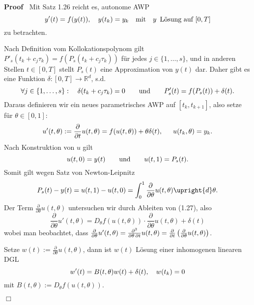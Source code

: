 \documentclass{book}
\newcommand{\assign}{:=}
\newenvironment{proof}{\noindent\textbf{Proof\ }}{\hspace*{\fill}$\Box$\medskip}
\begin{document}
\begin{proof}
  Mit Satz 1.26 reicht es, autonome AWP
  \[ y' (t) = f (y (t)), \text{\quad} y (t_k) = y_k \quad \text{mit\quad} y
     \enspace \text{L{\"o}sung auf } [0, T] \]
  zu betrachten.
  
  Nach Definition vom Kollokationspolynom gilt $P'_s (t_k + c_j \tau_k) = f
  (P_s (t_k + c_j \tau_k))$ f{\"u}r jedes $j \in \{ 1, \ldots, s \}$, und in
  anderen Stellen $t \in [0, T]$ stellt $P_s (t)$ eine Approximation von $y
  (t)$ dar. Daher gibt es eine Funktion $\delta : [0, T] \rightarrow
  \mathbb{R}^d$, s.d.
  \[ \forall j \in \{ 1, \ldots, s \} : \text{\quad} \delta (t_k + c_j
     \tau_k) = 0 \text{\qquad und\qquad} P'_s (t) = f (P_s (t)) + \delta (t) .
  \]
  {\hspace{1.7em}}Daraus definieren wir ein neues parametrisches AWP auf
  $[t_k, t_{k + 1}]$, also setze f{\"u}r $\theta \in [0, 1]$:
  \begin{equation}
    u' (t, \theta) \assign \frac{\partial}{\partial t} u (t, \theta) = f (u
    (t, \theta)) + \theta \delta (t), \text{{\hspace{1.5em}}} u (t_k, \theta)
    = y_k .
  \end{equation}
  {\hspace{1.7em}}Nach Konstruktion von $u$ gilt
  \[ u (t, 0) = y (t) \qquad \text{und\qquad} u (t, 1) = P_s (t) . \]
  {\hspace{1.7em}}Somit gilt wegen Satz von Newton-Leipnitz
  \begin{equation}
    P_s (t) - y (t) = u (t, 1) - u (t, 0) = \int_0^1 \frac{\partial}{\partial
    \theta} u (t, \theta) \upright{d} \theta .
  \end{equation}
  {\hspace{1.7em}}Der Term $\frac{\partial}{\partial \theta} u (t, \theta)$
  untersuchen wir durch Ableiten von (1.27), also
  \[ \frac{\partial}{\partial \theta} u' (t, \theta) = D_{\theta} f (u (t,
     \theta)) \cdot \frac{\partial}{\partial \theta} u (t, \theta) + \delta
     (t) \]
  wobei man beobachtet, dass $\frac{\partial}{\partial \theta} u' (t, \theta)
  = \frac{\partial^2}{\partial \theta \hspace{0.15em} \partial t} u (t,
  \theta) = \frac{\partial }{\partial t} \left( \frac{\partial}{\partial
  \theta} u (t, \theta) \right)$.
  
  Setze $w (t) \assign \frac{\partial}{\partial \theta} u (t, \theta)$, dann
  ist $w (t)$ L{\"o}sung einer inhomogenen linearen DGL
  \[ w' (t) = B (t, \theta) w (t) + \delta (t), \text{\quad} w (t_k) = 0 \]
  mit $B (t, \theta) \assign D_{\theta} f (u (t, \theta))$.
  

\end{proof}
\end{document}

